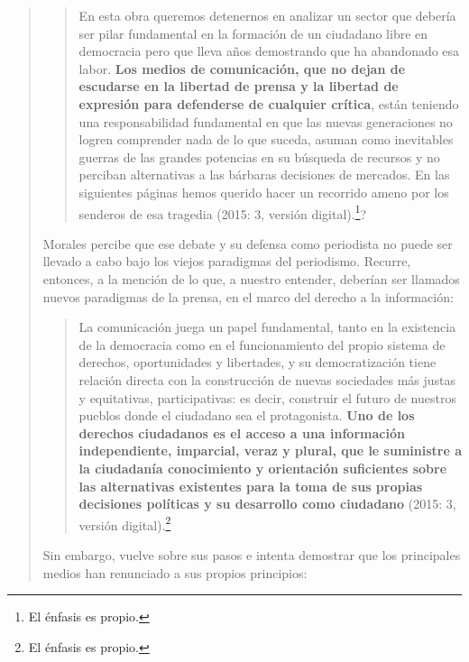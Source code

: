 \begin{quote}
\begin{quote}
	En esta obra queremos detenernos en analizar un sector que debería ser pilar fundamental en la formación de un ciudadano libre en democracia pero que lleva años demostrando que ha abandonado esa labor. \textbf{Los medios de comunicación, que no dejan de escudarse en la libertad de prensa y la libertad de expresión para defenderse de cualquier crítica}, están teniendo una responsabilidad fundamental en que las nuevas generaciones no logren comprender nada de lo que suceda, asuman como inevitables guerras de las grandes potencias en su búsqueda de recursos y no perciban alternativas a las bárbaras decisiones de mercados. En las siguientes páginas hemos querido hacer un recorrido ameno por los senderos de esa tragedia (2015: 3, versión digital).\footnote{El énfasis es propio.}?
\end{quote}


Morales percibe que ese debate y su defensa como periodista no puede ser llevado a cabo bajo los viejos paradigmas del periodismo. Recurre, entonces, a la mención de lo que, a nuestro entender, deberían ser llamados nuevos paradigmas de la prensa, en el marco del derecho a la información:

\begin{quote}
	La comunicación juega un papel fundamental, tanto en la existencia de la democracia como en el funcionamiento del propio sistema de derechos, oportunidades y libertades, y su democratización tiene relación directa con la construcción de nuevas sociedades más justas y equitativas, participativas: es decir, construir el futuro de nuestros pueblos donde el ciudadano sea el protagonista. \textbf{Uno de los derechos ciudadanos es el acceso a una información independiente, imparcial, veraz y plural, que le suministre a la ciudadanía conocimiento y orientación suficientes sobre las alternativas existentes para la toma de sus propias decisiones políticas y su desarrollo como ciudadano} (2015: 3, versión digital).\footnote{El énfasis es propio.}
\end{quote}


Sin embargo, vuelve sobre sus pasos e intenta demostrar que los principales medios han renunciado a sus propios principios:


\end{quote}
